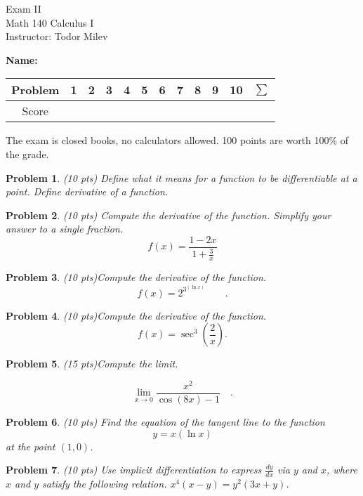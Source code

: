 \documentclass{article}
\newtheorem{problem}{Problem}
\begin{document}
\begin{center}
\Large
Exam II\\ Math 140 Calculus I \\ \normalsize Instructor: Todor Milev
\end{center}

\noindent \textbf{Name:} \hfill{~}
\begin{tabular}{c|c|c|c|c|c|c|c|c|c|c||c}
Problem&1 &2&3&4&5&6&7&8&9&10& $\sum$\\\hline
Score&&&&&&&&&&&
\end{tabular}

\noindent The exam is closed books, no calculators allowed. 100 points are worth 100\% of the grade.
\begin{problem}(10 pts)  Define what it means for a function to be differentiable at a point. Define derivative of a function.
\end{problem}

\vskip 8cm

\begin{problem}(10 pts)
Compute the derivative of the function. Simplify your answer to a single fraction.
\[f(x)=\frac{1-2x }{1+\frac{3}x}
\]
\end{problem}
\newpage
\begin{problem}(10 pts)Compute the derivative of the function.
\[
f(x)=2^{3^{(\ln x)}}\quad \quad.
\]
\end{problem}
\vskip 9cm

\begin{problem}(10 pts)Compute the derivative of the function.
\[f(x)= \sec^3 \left(\frac{2}{x}\right).
\]
\end{problem}

\newpage

\begin{problem}(15 pts)Compute the limit.

\[\lim\limits_{x\to 0}
\frac{x^2}{\cos(8x) -1} \quad .
\]

\end{problem}
\vskip 9cm


\begin{problem}(10 pts)
Find the equation of the tangent line to the function
\[
y=x(\ln x)
\]
at the point $(1, 0)$.
\end{problem}

\newpage

\begin{problem}(10 pts)
Use implicit differentiation to express $\frac{dy}{dx}$ via $y $ and $x$, where $x$ and $y$ satisfy the following relation.
$x^4(x-y)=y^2(3x+y)$.
\end{problem}
\vskip 9cm
\end{document}
